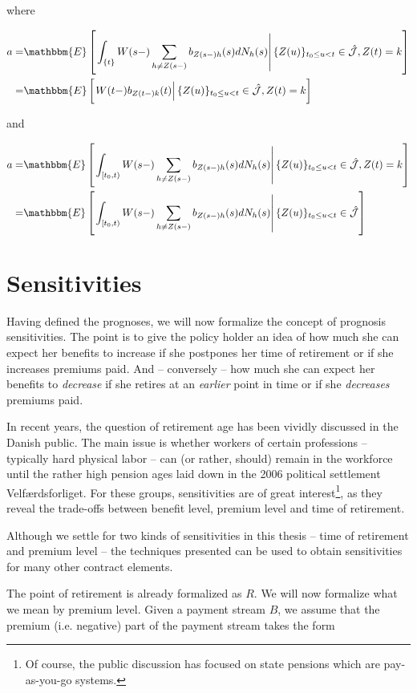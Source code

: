 \documentclass{book}
\newcommand{\1}[1]{\mathbbm{1}_{\left\lbrace #1 \right\rbrace}}
\newcommand{\econd}[2][def]{\mathbbm{E} \left[ \left. #1 \right| #2 \right]}
\theoremstyle{break}
\theoremstyle{remark}
\numberwithin{equation}{section}
\begin{document}
where

\begin{align*}
	a =& \econd[\int_{\{t\}} W(s-) \sum_{h \neq Z(s-)} b_{Z(s-)h}(s) dN_h(s)]{ \{ Z(u) \}_{t_0 \leq u < t} \in \hat{\mathcal{J}}, Z(t) = k} \\
	=& \econd[W(t-) b_{Z(t-)k}(t)]{ \{ Z(u) \}_{t_0 \leq u < t} \in \hat{\mathcal{J}}, Z(t) = k} 
\end{align*}

and

\begin{align*}
	a =& \econd[\int_{[t_0,t)} W(s-) \sum_{h \neq Z(s-)} b_{Z(s-)h}(s) dN_h(s)]{ \{ Z(u) \}_{t_0 \leq u < t} \in \hat{\mathcal{J}}, Z(t) = k} \\
	=& \econd[\int_{[t_0,t)} W(s-) \sum_{h \neq Z(s-)} b_{Z(s-)h}(s) dN_h(s)]{ \{ Z(u) \}_{t_0 \leq u < t} \in \hat{\mathcal{J}}}
\end{align*}

\chapter{Sensitivities}

Having defined the prognoses, we will now formalize the concept of prognosis sensitivities. The point is to give the policy holder an idea of how much she can expect her benefits to increase if she postpones her time of retirement or if she increases premiums paid. And -- conversely -- how much she can expect her benefits to \textit{decrease} if she retires at an \textit{earlier} point in time or if she \textit{decreases} premiums paid.

In recent years, the question of retirement age has been vividly discussed in the Danish public. The main issue is whether workers of certain professions -- typically hard physical labor -- can (or rather, should) remain in the workforce until the rather high pension ages laid down in the 2006 political settlement Velfærdsforliget. For these groups, sensitivities are of great interest\footnote{Of course, the public discussion has focused on state pensions which are pay-as-you-go systems.}, as they reveal the trade-offs between benefit level, premium level and time of retirement.

Although we settle for two kinds of sensitivities in this thesis -- time of retirement and premium level -- the techniques presented can be used to obtain sensitivities for many other contract elements.

The point of retirement is already formalized as $R$. We will now formalize what we mean by premium level. Given a payment stream $B$, we assume that the premium (i.e. negative) part of the payment stream takes the form
\end{document}
